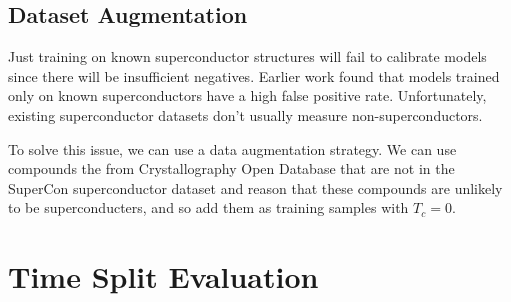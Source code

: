 \documentclass[book.tex]{subfiles}
\begin{document}
\subsection{Dataset Augmentation}


Just training on known superconductor structures will fail to calibrate models since there will be insufficient negatives. Earlier work found that models trained only on known superconductors have a high false positive rate. Unfortunately, existing superconductor datasets don't usually measure non-superconductors. 


To solve this issue, we can use a data augmentation strategy. We can use compounds the from Crystallography Open Database that are not in the SuperCon superconductor dataset and reason that these compounds are unlikely to be superconducters, and so add them as training samples with $T_c = 0$. %




\section{Time Split Evaluation}
\end{document}
